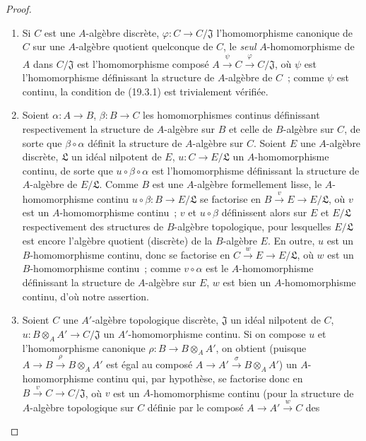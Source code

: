 \begin{proof}
\begin{enumerate}
  \item[(i)] Si $C$ est une $A$-algèbre discrète,
  $\varphi:C\to C/\mathfrak J$ l'homomorphisme canonique de $C$ sur une
  $A$-algèbre quotient quelconque de $C$, le \emph{seul} $A$-homomorphisme
  de $A$ dans $C/\mathfrak J$ est l'homomorphisme composé
  $A\xrightarrow{\psi}C\xrightarrow{\varphi}C/\mathfrak J$, où
  $\psi$ est l'homomorphisme définissant la structure de $A$-algèbre de
  $C$~; comme $\psi$ est continu, la condition de (19.3.1) est trivialement
  vérifiée.
  \item[(ii)] Soient $\alpha:A\to B$, $\beta:B\to C$ les homomorphismes
  continus définissant respectivement la structure de $A$-algèbre sur $B$ et
  celle de $B$-algèbre sur $C$, de sorte que $\beta\circ\alpha$ définit la
  structure de $A$-algèbre sur $C$. Soient $E$ une $A$-algèbre discrète,
  $\mathfrak L$ un idéal nilpotent de $E$, $u:C\to E/\mathfrak L$ un
  $A$-homomorphisme continu, de sorte que $u\circ\beta\circ\alpha$ est
  l'homomorphisme définissant la structure de $A$-algèbre de
  $E/\mathfrak L$. Comme $B$ est une $A$-algèbre formellement lisse, le
  $A$-homomorphisme continu $u\circ\beta:B\to E/\mathfrak L$ se
  factorise en $B\xrightarrow{v}E\to E/\mathfrak L$, où $v$ est un
  $A$-homomorphisme continu~; $v$ et $u\circ\beta$ définissent alors sur
  $E$ et $E/\mathfrak L$ respectivement des structures de $B$-algèbre
  topologique, pour lesquelles $E/\mathfrak L$ est
encore l'algèbre quotient
  (discrète) de la $B$-algèbre $E$. En outre, $u$ est un $B$-homomorphisme
  continu, donc se factorise en $C\xrightarrow{w}E\to E/\mathfrak L$,
  où $w$ est un $B$-homomorphisme continu~; comme
  $v\circ\alpha$ est le $A$-homomorphisme définissant la structure de
  $A$-algèbre sur $E$, $w$ est bien un $A$-homomorphisme continu, d'où notre
  assertion.
  \item[(iii)] Soient $C$ une $A'$-algèbre topologique discrète,
  $\mathfrak J$ un idéal nilpotent de $C$,
  $u:B\otimes_A A'\to C/\mathfrak J$ un $A'$-homomorphisme continu. Si on
  compose $u$ et l'homomorphisme canonique
  $\rho:B\to B\otimes_A A'$, on obtient (puisque
  $A\to B\xrightarrow{\rho}B\otimes_A A'$ est égal au composé
  $A\to A'\xrightarrow{\sigma}B\otimes_A A'$) un $A$-homomorphisme
  continu qui, par hypothèse, se factorise donc en
  $B\xrightarrow{v}C\to C/\mathfrak J$, où $v$ est un $A$-homomorphisme
  continu (pour la structure de $A$-algèbre
  topologique sur $C$ définie par le composé $A\to A'\xrightarrow{w}C$ des

\end{enumerate}
\end{proof}
